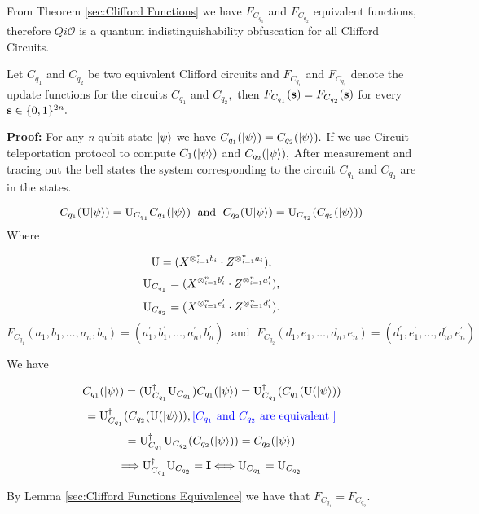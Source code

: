 From Theorem \ref{sec:Clifford Functions} we have $F_{C_{q_1}}$ and $F_{C_{q_2}}$ equivalent functions, therefore $Qi\mathcal{O}$ is a quantum indistinguishability obfuscation for all Clifford Circuits. 

\begin{theorem}\label{sec:Clifford Functions}
Let $C_{q_1}$ and $C_{q_2}$ be two equivalent Clifford circuits and  $F_{C_{q_1}}$ and $F_{C_{q_2}}$  denote the update functions for the circuits $C_{q_1}$ and $C_{q_2},$ then $F_{C_{q_1}}({\bf s})=F_{C_{q_2}}({\bf s})$ for every ${\bf s}\in\{0,1\}^{2n}.$
\end{theorem}


\begin{flushleft}
{\bf Proof:} For any {\em n}-qubit state ${\lvert}\psi\rangle$ we have $C_{q_1}({\lvert}\psi\rangle)=C_{q_2}({\lvert}\psi\rangle).$ If we use Circuit teleportation protocol to compute $C_1({\lvert}\psi\rangle)$ and $C_{q_2}({\lvert}\psi\rangle),$ After measurement and tracing out the bell states the system corresponding to the circuit $C_{q_1}$ and $C_{q_2}$ are in the states.

$$C_{q_1} ({\rm {\rm U}}{\lvert}\psi\rangle)={\rm {\rm U}}_{C_{q_1}}C_{q_1}({\lvert}\psi\rangle)  \;\mbox{ and }\; C_{q_2} ({\rm {\rm U}}{\lvert}\psi\rangle)={\rm {\rm U}}_{C_{q_2}}(C_{q_2}({\lvert}\psi\rangle))$$
Where

 $${\rm {\rm U}}=( X^{\otimes_{i=1}^{n} b_{i}} \cdot Z^{\otimes_{i=1}^{n} a_{i}}),$$ 
$${\rm {\rm U}}_{C_{q_1}}=(X^{\otimes_{i=1}^{n} b^\prime_{i}} \cdot Z^{\otimes_{i=1}^{n} a^\prime_{i}}),$$
$${\rm {\rm U}}_{C_{q_2}}=(X^{\otimes_{i=1}^{n} e^\prime_{i}} \cdot Z^{\otimes_{i=1}^{n} d^\prime_{i}}).$$
$$F_{C_{q_1}}(a_1,b_1,\ldots, a_n,b_n)=(a^\prime_1,b^\prime_1,\ldots, a^\prime_n,b^\prime_n) \;\mbox{ and }\; F_{C_{q_2}}(d_1,e_1,\ldots, d_n,e_n)=(d_1^\prime,e_1^\prime,\ldots, d_n^\prime,e^\prime_n)$$ 

We have 

$$C_{q_1}({\lvert}\psi\rangle)=({\rm {\rm U}}_{C_{q_1}}^\dagger {\rm {\rm U}}_{C_{q_1}})C_{q_1}({\lvert}\psi\rangle)={\rm {\rm U}}_{C_{q_1}}^\dagger ( C_{q_1}({\rm {\rm U}}({\lvert}\psi\rangle))$$
$$={\rm {\rm U}}_{C_{q_1}}^\dagger ( C_{q_2}({\rm {\rm U}}({\lvert}\psi\rangle)),  {\color{blue}[C_{q_1} \mbox{ and } C_{q_2} \mbox{ are equivalent } ]}$$
$$={\rm {\rm U}}_{C_{q_1}}^\dagger {\rm {\rm U}}_{C_{q_2}}(C_{q_2}({\lvert}\psi\rangle))=C_{q_2}({\lvert}\psi\rangle)$$
$$\Longrightarrow {\rm {\rm U}}_{C_{q_1}}^\dagger {\rm {\rm U}}_{C_{q_2}}={\bf I}\Longleftrightarrow {\rm {\rm U}}_{C_{q_1}}={\rm {\rm U}}_{C_{q_2}}$$


By Lemma \ref{sec:Clifford Functions Equivalence}  we have that $F_{C_{q_1}}=F_{C_{q_2}}.$
\end{flushleft}

